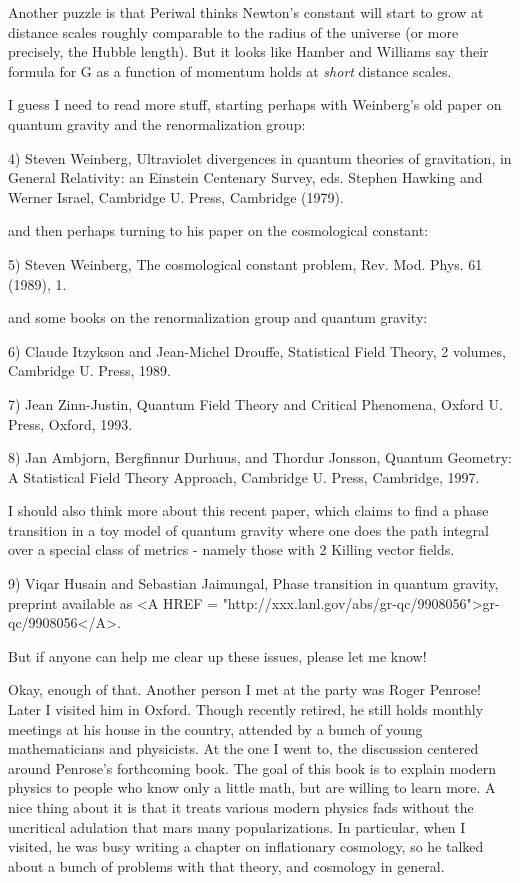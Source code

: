 Another puzzle is that Periwal thinks Newton's constant will start
to grow at distance scales roughly comparable to the radius of the
universe (or more precisely, the Hubble length).  But it looks like
Hamber and Williams say their formula for G as a function of momentum
holds at \emph{short} distance scales.  

I guess I need to read more stuff, starting perhaps with Weinberg's 
old paper on quantum gravity and the renormalization group:

4) Steven Weinberg, Ultraviolet divergences in quantum theories of
gravitation, in General Relativity: an Einstein Centenary Survey, 
eds. Stephen Hawking and Werner Israel, Cambridge U. Press, Cambridge
(1979).

and then perhaps turning to his paper on the cosmological constant:

5) Steven Weinberg, The cosmological constant problem, Rev. Mod. Phys.
61 (1989), 1.  

and some books on the renormalization group and quantum gravity:

6) Claude Itzykson and Jean-Michel Drouffe, Statistical Field Theory,
2 volumes, Cambridge U. Press, 1989.

7) Jean Zinn-Justin, Quantum Field Theory and Critical Phenomena,
Oxford U. Press, Oxford, 1993.

8) Jan Ambjorn, Bergfinnur Durhuus, and Thordur Jonsson, Quantum 
Geometry: A Statistical Field Theory Approach, Cambridge U. Press, 
Cambridge, 1997.

I should also think more about this recent paper, which claims to
find a phase transition in a toy model of quantum gravity where
one does the path integral over a special class of metrics - namely 
those with 2 Killing vector fields.

9) Viqar Husain and Sebastian Jaimungal, Phase transition in 
quantum gravity, preprint available as <A HREF = "http://xxx.lanl.gov/abs/gr-qc/9908056">gr-qc/9908056</A>.

But if anyone can help me clear up these issues, please let me know!

Okay, enough of that.  Another person I met at the party was Roger
Penrose!  Later I visited him in Oxford.  Though recently retired,
he still holds monthly meetings at his house in the country, attended
by a bunch of young mathematicians and physicists.  At the one I went
to, the discussion centered around Penrose's forthcoming book.  The goal 
of this book is to explain modern physics to people who know only a 
little math, but are willing to learn more.  A nice thing about it is
that it treats various modern physics fads without the uncritical 
adulation that mars many popularizations.  In particular, when I 
visited, he was busy writing a chapter on inflationary cosmology, 
so he talked about a bunch of problems with that theory, and cosmology
in general.  

